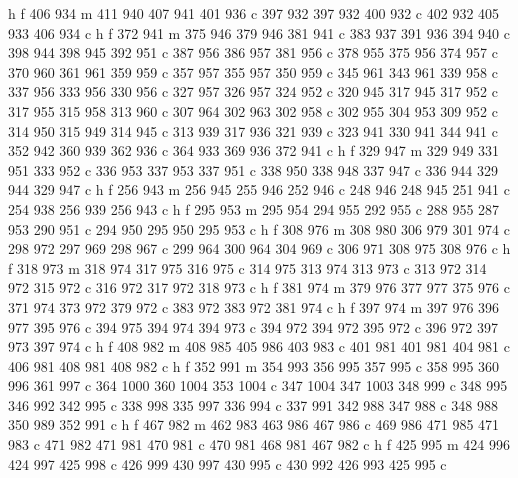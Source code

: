 {{        h f
        406 934 m
        411 940 407 941 401 936 c
        397 932 397 932 400 932 c
        402 932 405 933 406 934 c
        h f
        372 941 m
        375 946 379 946 381 941 c
        383 937 391 936 394 940 c
        398 944 398 945 392 951 c
        387 956 386 957 381 956 c
        378 955 375 956 374 957 c
        370 960 361 961 359 959 c
        357 957 355 957 350 959 c
        345 961 343 961 339 958 c
        337 956 333 956 330 956 c
        327 957 326 957 324 952 c
        320 945 317 945 317 952 c
        317 955 315 958 313 960 c
        307 964 302 963 302 958 c
        302 955 304 953 309 952 c
        314 950 315 949 314 945 c
        313 939 317 936 321 939 c
        323 941 330 941 344 941 c
        352 942 360 939 362 936 c
        364 933 369 936 372 941 c
        h f
        329 947 m
        329 949 331 951 333 952 c
        336 953 337 953 337 951 c
        338 950 338 948 337 947 c
        336 944 329 944 329 947 c
        h f
        256 943 m
        256 945 255 946 252 946 c
        248 946 248 945 251 941 c
        254 938 256 939 256 943 c
        h f
        295 953 m
        295 954 294 955 292 955 c
        288 955 287 953 290 951 c
        294 950 295 950 295 953 c
        h f
        308 976 m
        308 980 306 979 301 974 c
        298 972 297 969 298 967 c
        299 964 300 964 304 969 c
        306 971 308 975 308 976 c
        h f
        318 973 m
        318 974 317 975 316 975 c
        314 975 313 974 313 973 c
        313 972 314 972 315 972 c
        316 972 317 972 318 973 c
        h f
        381 974 m
        379 976 377 977 375 976 c
        371 974 373 972 379 972 c
        383 972 383 972 381 974 c
        h f
        397 974 m
        397 976 396 977 395 976 c
        394 975 394 974 394 973 c
        394 972 394 972 395 972 c
        396 972 397 973 397 974 c
        h f
        408 982 m
        408 985 405 986 403 983 c
        401 981 401 981 404 981 c
        406 981 408 981 408 982 c
        h f
        352 991 m
        354 993 356 995 357 995 c
        358 995 360 996 361 997 c
        364 1000 360 1004 353 1004 c
        347 1004 347 1003 348 999 c
        348 995 346 992 342 995 c
        338 998 335 997 336 994 c
        337 991 342 988 347 988 c
        348 988 350 989 352 991 c
        h f
        467 982 m
        462 983 463 986 467 986 c
        469 986 471 985 471 983 c
        471 982 471 981 470 981 c
        470 981 468 981 467 982 c
        h f
        425 995 m
        424 996 424 997 425 998 c
        426 999 430 997 430 995 c
        430 992 426 993 425 995 c
}}
